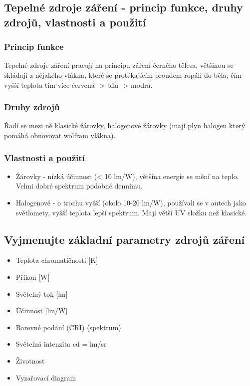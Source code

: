\documentclass[a4paper, 12pt]{article}
\begin{document}
        \subsection{Tepelné zdroje záření - princip funkce, druhy zdrojů, vlastnosti a použití}
            \subsubsection{Princip funkce}
                Tepelné zdroje záření pracují na principu záření černého tělesa, většinou se skládají
                z nějakého vlákna, které se protékajícím proudem ropálí do běla, čím vyšší teplota tím více červená -> bílá -> modrá.
            \subsubsection{Druhy zdrojů}
                Řadí se mezi ně klasické žárovky, halogenové žárovky (mají plyn halogen který pomáhá obnovovat wolfram vlákna).
            \subsubsection{Vlastnosti a použití}
                \begin{itemize}
                    \item Žárovky - nízká účinnost (< 10 lm/W), většina energie se mění na teplo. Velmi dobré spektrum podobné dennímu.
                    \item Halogenové - o trochu vyšší (okolo 10-20 lm/W), používali se v autech jako světlomety, vyšší teplota lepší spektrum. Mají větší UV složku než klasické.
                \end{itemize}
            
        \subsection{Vyjmenujte základní parametry zdrojů záření}
            \begin{itemize}
                \item Teplota chromatičnosti [K]
                \item Příkon [W]
                \item Světelný tok [lm]
                \item Účinnost [lm/W]
                \item Barevné podání (CRI) (spektrum)
                \item Světelná intenzita cd = lm/sr
                \item Životnost
                \item Vyzařovací diagram
            \end{itemize}
\end{document}
